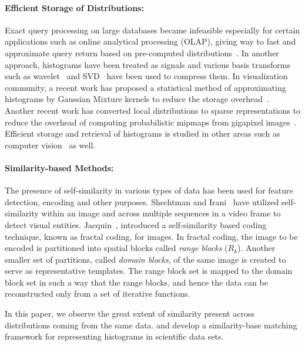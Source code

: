 \paragraph{Efficient Storage of Distributions:} Exact query processing on large databases became infeasible especially for certain applications such as online analytical processing (OLAP), giving way to fast and approximate query return based on pre-computed distributions~\cite{Buccafurri02}. In another approach, histograms have been treated as
signals and various basis transforms such as wavelet~\cite{WaveletHist98} and SVD~\cite{SVD97} have been used to compress them. In visualization community, a recent work has proposed a statistical method of approximating histograms by Gaussian Mixture kernels to reduce the storage overhead~\cite{GMM12}. Another recent work has converted local distributions to sparse representations to reduce the overhead of computing probabilistic mipmaps from gigapixel images~\cite{Hadwiger12}. Efficient storage and retrieval of histograms is studied in other areas such as computer vision~\cite{CHOG2012} as well. 

\paragraph{Similarity-based Methods:} The presence of self-similarity in various types of data has been  used for feature detection, encoding and other purposes. Shechtman and Irani~\cite{selfsimilarity07} have utilized self-similarity within an image and across multiple sequences in a video frame to detect visual entities. Jacquin~\cite{Jacquin92}, 
introduced a self-similarity based coding technique, known as fractal coding, for images. In fractal coding, the image to be encoded is partitioned into spatial blocks called \emph{range blocks} ($R_k$). Another smaller set of partitions, called \emph{domain blocks}, of the same image is created to serve as representative templates. The range block set is mapped to the domain block set in such a way that the range blocks, and hence the data can be reconstructed only from a set of iterative functions. 

In this paper, we observe the great extent of similarity present across distributions coming from the same data. and develop a similarity-base matching framework for representing histograms in scientific data sets. 




